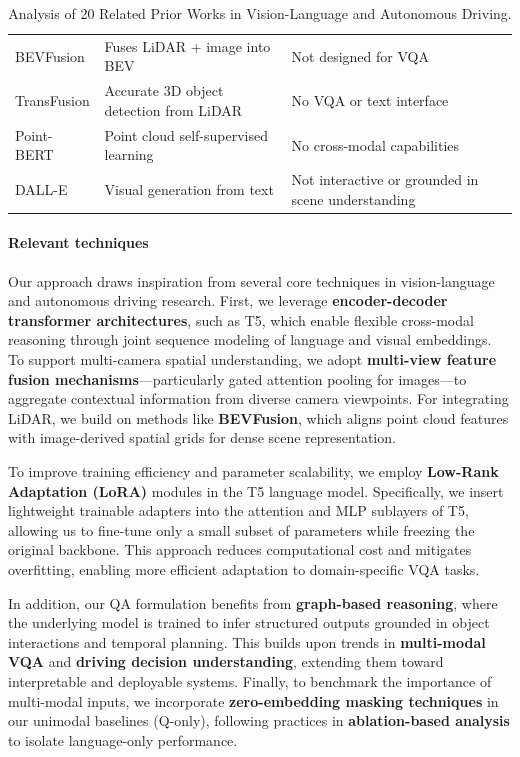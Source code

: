 \documentclass{article} %
\begin{document}
\begin{table}[htbp]
\begin{tabular}{p{3.2cm} p{5.4cm} p{5.4cm}}
BEVFusion \cite{liu2022bevfusion} & Fuses LiDAR + image into BEV & Not designed for VQA \\
TransFusion \cite{bai2022transfusion} & Accurate 3D object detection from LiDAR & No VQA or text interface \\
Point-BERT \cite{yu2022pointbert} & Point cloud self-supervised learning & No cross-modal capabilities \\
DALL-E \cite{ramesh2021dalle} & Visual generation from text & Not interactive or grounded in scene understanding \\
\bottomrule
\end{tabular}
\caption{Analysis of 20 Related Prior Works in Vision-Language and Autonomous Driving.}
\label{tab:priorwork}
\end{table}


\paragraph{Relevant techniques}
Our approach draws inspiration from several core techniques in vision-language and autonomous driving research. First, we leverage \textbf{encoder-decoder transformer architectures}, such as T5, which enable flexible cross-modal reasoning through joint sequence modeling of language and visual embeddings. To support multi-camera spatial understanding, we adopt \textbf{multi-view feature fusion mechanisms}—particularly gated attention pooling for images—to aggregate contextual information from diverse camera viewpoints. For integrating LiDAR, we build on methods like \textbf{BEVFusion}, which aligns point cloud features with image-derived spatial grids for dense scene representation.

To improve training efficiency and parameter scalability, we employ \textbf{Low-Rank Adaptation (LoRA)} modules in the T5 language model. Specifically, we insert lightweight trainable adapters into the attention and MLP sublayers of T5, allowing us to fine-tune only a small subset of parameters while freezing the original backbone. This approach reduces computational cost and mitigates overfitting, enabling more efficient adaptation to domain-specific VQA tasks.

In addition, our QA formulation benefits from \textbf{graph-based reasoning}, where the underlying model is trained to infer structured outputs grounded in object interactions and temporal planning. This builds upon trends in \textbf{multi-modal VQA} and \textbf{driving decision understanding}, extending them toward interpretable and deployable systems. Finally, to benchmark the importance of multi-modal inputs, we incorporate \textbf{zero-embedding masking techniques} in our unimodal baselines (Q-only), following practices in \textbf{ablation-based analysis} to isolate language-only performance.
\end{document}
